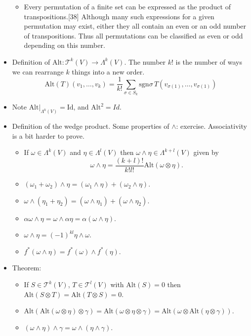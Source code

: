 \documentclass{amsart}
\begin{document}
\begin{itemize}
\begin{itemize}
\item Every permutation of a finite set can be expressed as the product of transpositions.[38] Although many such expressions for a given permutation may exist, either they all contain an even or an odd number of transpositions. Thus all permutations can be classified as even or odd depending on this number.
\end{itemize}
\item Definition of \(\mbox{Alt}:\mathcal{T}^k(V) \to \Lambda^k(V)\).  The number \(k!\) is the number of ways we can rearrange \(k\) things into a new order. \[ \mbox{Alt}(T)(v_1,\ldots,v_k)  = \frac{1}{k!}\sum_{\sigma\in S_k} \mbox{sgn} \sigma \, T(v_{\sigma(1)},\ldots, v_{\sigma(1)}) \]
\item Note \(\left.\mbox{Alt}\right|_{\Lambda^k(V)} = \mbox{Id}\), and \(\mbox{Alt}^2 = Id\).
\item Definition of the wedge product. Some properties of \(\wedge\): exercise. Associativity is a bit harder to prove.
\begin{itemize}
\item If \(\omega\in \Lambda^k(V)\) and \(\eta\in \Lambda^l(V)\) then \(\omega \wedge \eta \in \Lambda^{k+l}(V)\) given by \[ \omega \wedge \eta = \frac{(k+l)!}{k! l!} \mbox{Alt} (\omega \otimes \eta). \]
\item \((\omega_1 + \omega_2) \wedge \eta = (\omega_1 \wedge \eta) + (\omega_2 \wedge \eta)\).
\item \(\omega \wedge (\eta_1 + \eta_2)  = (\omega \wedge \eta_1) + (\omega \wedge \eta_2)\).
\item \(\alpha\omega \wedge \eta = \omega \wedge \alpha\eta = \alpha(\omega \wedge \eta)\).
\item \(\omega \wedge \eta = (-1)^{kl}\eta \wedge \omega\).
\item \(f^*(\omega\wedge \eta) = f^*(\omega) \wedge f^*(\eta)\).
\end{itemize}
\item Theorem:
\begin{itemize}
\item If \(S\in \mathcal{T}^k(V)\), \(T\in \mathcal{T}^l(V)\) with \(\mbox{Alt}(S) = 0\) then \(\mbox{Alt}(S\otimes T) = \mbox{Alt}(T\otimes S) = 0\).
\item \(\mbox{Alt}(\mbox{Alt}(\omega\otimes \eta) \otimes \gamma) = \mbox{Alt}(\omega \otimes \eta \otimes \gamma) = \mbox{Alt}(\omega\otimes \mbox{Alt}(\eta \otimes \gamma))\).
\item \((\omega \wedge \eta) \wedge \gamma = \omega \wedge (\eta \wedge \gamma)\).

\end{itemize}
\end{itemize}
\end{document}
